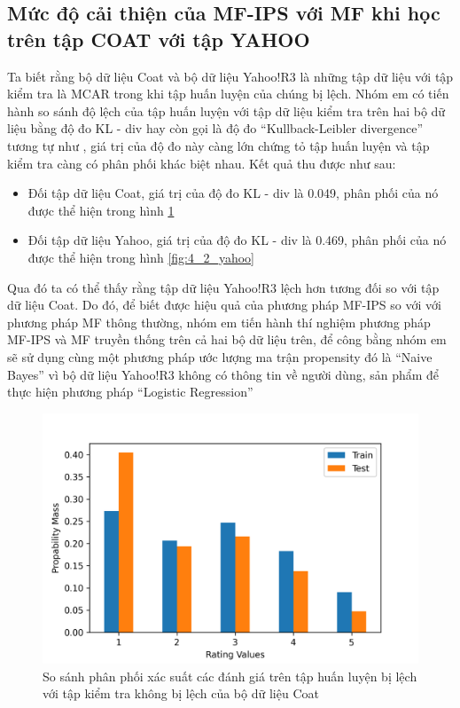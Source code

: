 \subsection{Mức độ cải thiện của MF-IPS với MF khi học trên tập COAT với tập YAHOO}

Ta biết rằng bộ dữ liệu Coat và bộ dữ liệu Yahoo!R3 là những tập dữ liệu với tập kiểm tra là MCAR trong khi tập huấn luyện của chúng bị lệch. Nhóm em có tiến hành so sánh độ lệch của tập huấn luyện với tập dữ liệu kiểm tra trên hai bộ dữ liệu bằng độ đo KL - div hay còn gọi là độ đo ``Kullback-Leibler divergence'' tương tự như \cite{saito2020asymmetric}, giá trị của độ đo này càng lớn chứng tỏ tập huấn luyện và tập kiểm tra càng có phân phối khác biệt nhau. Kết quả thu được như sau:
\begin{itemize}
    \item Đối tập dữ liệu Coat, giá trị của độ đo KL - div là 0.049, phân phối của nó được thể hiện trong hình \ref{fig:4_1_coat}
    \item Đối tập dữ liệu Yahoo, giá trị của độ đo KL - div là 0.469, phân phối của nó được thể hiện trong hình \ref{fig:4_2_yahoo}
\end{itemize}
Qua đó ta có thể thấy rằng tập dữ liệu Yahoo!R3 lệch hơn tương đối so với tập dữ liệu Coat. Do đó, để biết được hiệu quả của phương pháp MF-IPS so với với phương pháp MF thông thường, nhóm em tiến hành thí nghiệm phương pháp MF-IPS và MF truyền thống trên cả hai bộ dữ liệu trên, để công bằng nhóm em sẽ sử dụng cùng một phương pháp ước lượng ma trận propensity đó là ``Naive Bayes'' vì bộ dữ liệu Yahoo!R3 không có thông tin về người dùng, sản phẩm để thực hiện phương pháp ``Logistic Regression''  

\begin{figure}[h]
    \centering
    \includegraphics[width=\textwidth]{images/Chapter4/Diff_coat.png}
    \caption{So sánh phân phối xác suất các đánh giá trên tập huấn luyện bị lệch với tập kiểm tra không bị lệch của bộ dữ liệu Coat}
    \label{fig:4_1_coat}
\end{figure}

